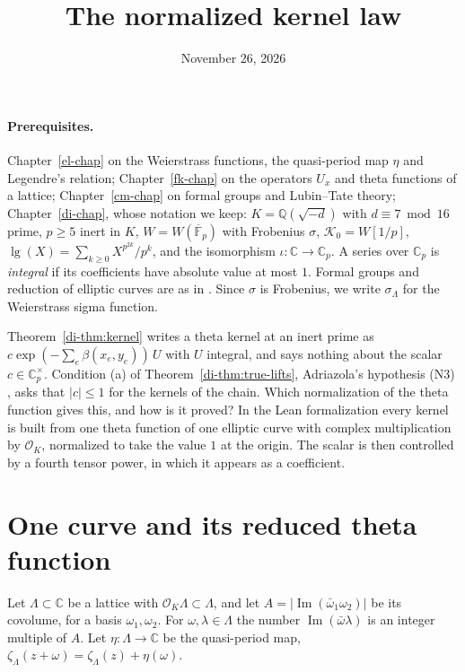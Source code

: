 \documentclass[reqno]{amsart}
\title{The normalized kernel law}
\author{}
\date{November 26, 2026}
\newcounter{chap}
\theoremstyle{definition}
\theoremstyle{plain}
\theoremstyle{remark}
\newcommand{\Q}{\mathbb Q}
\newcommand{\C}{\mathbb C}
\newcommand{\Oc}{\mathcal O}
\newcommand{\Kc}{\mathcal K}
\renewcommand{\lg}{\operatorname{lg}}
\begin{document}
\maketitle
{}\label{chap}

\paragraph{Prerequisites.}
Chapter~\ref{el-chap} on the Weierstrass functions, the quasi-period map \(\eta\) and Legendre's relation; Chapter~\ref{fk-chap} on the operators \(U_x\) and theta functions of a lattice; Chapter~\ref{cm-chap} on formal groups and Lubin--Tate theory; Chapter~\ref{di-chap}, whose notation we keep: \(K=\Q(\sqrt{-d})\) with \(d\equiv7\bmod16\) prime, \(p\ge5\) inert in \(K\), \(W=W(\overline{\mathbb F}_p)\) with Frobenius \(\sigma\), \(\Kc_0=W[1/p]\), \(\lg(X)=\sum_{k\ge0}X^{p^{2k}}/p^k\), and the isomorphism \(\iota\colon\C\to\C_p\).  A series over \(\C_p\) is \emph{integral} if its coefficients have absolute value at most \(1\).  Formal groups and reduction of elliptic curves are as in \cite[Chs.~IV and~VII]{AEC}.  Since \(\sigma\) is Frobenius, we write \(\sigma_\Lambda\) for the Weierstrass sigma function.

Theorem~\ref{di-thm:kernel} writes a theta kernel at an inert prime as \(c\exp(-\sum_e\beta(x_e,y_e))\,U\) with \(U\) integral, and says nothing about the scalar \(c\in\C_p^\times\).  Condition (a) of Theorem~\ref{di-thm:true-lifts}, Adriazola's hypothesis (N3) \cite[Hyp.~11.42]{Adr}, asks that \(\lvert c\rvert\le1\) for the kernels of the chain.  Which normalization of the theta function gives this, and how is it proved?  In the Lean formalization \cite{Lean} every kernel is built from one theta function of one elliptic curve with complex multiplication by \(\Oc_K\), normalized to take the value \(1\) at the origin.  The scalar is then controlled by a fourth tensor power, in which it appears as a coefficient.

\section{One curve and its reduced theta function}\label{sec:one}
Let \(\Lambda\subset\C\) be a lattice with \(\Oc_K\Lambda\subset\Lambda\), and let \(A=\lvert\operatorname{Im}(\bar\omega_1\omega_2)\rvert\) be its covolume, for a basis \(\omega_1,\omega_2\).  For \(\omega,\lambda\in\Lambda\) the number \(\operatorname{Im}(\bar\omega\lambda)\) is an integer multiple of \(A\).  Let \(\eta\colon\Lambda\to\C\) be the quasi-period map, \(\zeta_\Lambda(z+\omega)=\zeta_\Lambda(z)+\eta(\omega)\).
\end{document}
